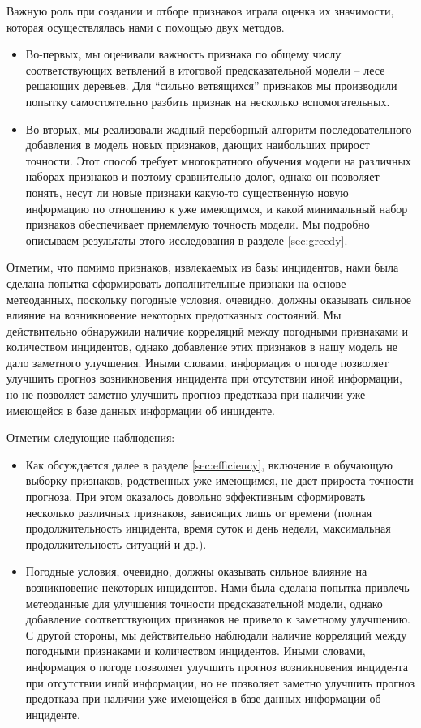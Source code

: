 Важную роль при создании и отборе признаков играла оценка их значимости, которая осуществлялась нами с помощью двух методов.
\begin{itemize}
\item
Во-первых, мы оценивали важность признака по общему числу соответствующих ветвлений в итоговой предсказательной модели -- лесе решающих деревьев. Для ``сильно ветвящихся'' признаков мы производили попытку самостоятельно разбить признак на несколько вспомогательных.
\item Во-вторых, мы реализовали жадный переборный алгоритм последовательного добавления в модель новых признаков, дающих наибольших прирост точности. Этот способ требует многократного обучения модели на различных наборах признаков и поэтому сравнительно долог, однако он позволяет понять, несут ли новые признаки какую-то существенную новую информацию по отношению к уже имеющимся, и какой минимальный набор признаков обеспечивает приемлемую точность модели. Мы подробно описываем результаты этого исследования в разделе \ref{sec:greedy}.
\end{itemize}
Отметим, что помимо признаков, извлекаемых из базы инцидентов, нами была сделана попытка сформировать дополнительные признаки на основе метеоданных, поскольку погодные условия, очевидно, должны оказывать сильное влияние на возникновение некоторых предотказных состояний. Мы действительно обнаружили наличие корреляций между погодными признаками и количеством инцидентов, однако добавление этих признаков в нашу модель не дало заметного улучшения. Иными словами, информация о погоде позволяет улучшить прогноз возникновения инцидента при отсутствии иной информации, но не позволяет заметно улучшить прогноз предотказа при наличии уже имеющейся в базе данных информации об инциденте.


Отметим следующие наблюдения:
\begin{itemize}
\item Как обсуждается далее в разделе \ref{sec:efficiency}, включение в обучающую выборку признаков, родственных уже имеющимся, не дает прироста точности прогноза.
При этом оказалось довольно эффективным сформировать несколько различных признаков, зависящих лишь от времени (полная продолжительность инцидента, время суток и день недели, максимальная продолжительность ситуаций и др.).
\item Погодные условия, очевидно, должны оказывать сильное влияние на возникновение некоторых инцидентов. Нами была сделана попытка привлечь метеоданные для улучшения точности предсказательной модели, однако добавление соответствующих признаков не привело к заметному улучшению. С другой стороны, мы действительно наблюдали наличие корреляций между погодными признаками и количеством инцидентов. Иными словами, информация о погоде позволяет улучшить прогноз возникновения инцидента при отсутствии иной информации, но не позволяет заметно улучшить прогноз предотказа при наличии уже имеющейся в базе данных информации об инциденте.
\end{itemize}

